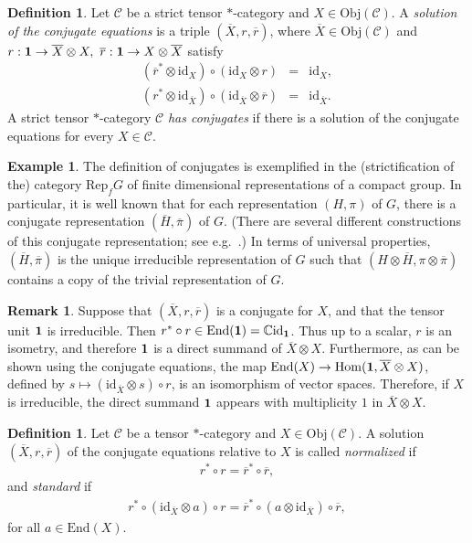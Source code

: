 \documentclass[12pt]{article}
\theoremstyle{definition}
\theoremstyle{definition}
\newtheorem{defn}[thm]{Definition}
\newtheorem{example}[thm]{Example}
\newtheorem{note}[thm]{Remark}
\theoremstyle{remark}
\newcommand{\Obj}{\mathrm{Obj}}
\def\2#1{{\mathcal #1}}
\def\7#1{{\mathbb #1}}
\def\1#1{{\bf #1}}
\def\ol#1{{\overline #1}}
\newcommand{\Hom}{\mathrm{Hom}}
\newcommand{\End}{\mathrm{End}}
\newcommand{\Rep}{\mathrm{Rep}}
\newcommand{\rarr}{\rightarrow}
\def\id{\mathrm{id}}
\begin{document}
\begin{defn} Let $\2C$ be a strict tensor $*$-category
  and $X\in\Obj (\2C )$. A \emph{solution of the
    conjugate equations} is a triple
  $(\overline{X},r,\overline{r})$, where
  $\overline{X}\in\Obj (\2C )$ and $r:\11\rarr
  \overline{X}\otimes X,\ \overline{r}:\11\rarr
  X\otimes\overline{X}$ satisfy
\begin{eqnarray*}
  (\overline{r}^*\otimes\id_X )\circ (\id_X\otimes r) &=&\id_X, \\
  (r^*\otimes\id_{\overline{X}})\circ (\id_{\overline{X}}\otimes\overline{r}) 
  &=&\id_{\overline{X}}.
\end{eqnarray*}
A strict tensor $*$-category $\2C$ \emph{has
  conjugates} if there is a solution of the conjugate
equations for every $X\in\2C$.
\end{defn}


\begin{example} The definition of conjugates is
  exemplified in the (strictification of the) category
  $\Rep _fG$ of finite dimensional representations of a
  compact group.  In particular, it is well known that
  for each representation $(H, \pi)$ of $G$, there is a
  conjugate representation $(\ol H ,\ol\pi )$ of $G$.
  (There are several different constructions of this
  conjugate representation; see e.g.\ \cite[p.\
  30]{simon}.)  In terms of universal properties, $(\ol
  H,\ol\pi )$ is the unique irreducible representation
  of $G$ such that $(H\otimes \ol H ,\pi \otimes \ol\pi
  )$ contains a copy of the trivial representation of
  $G$.
\end{example}

\begin{note} Suppose that $(\ol X,r,\ol r)$ is a
  conjugate for $X$, and that the tensor unit $\11$ is
  irreducible.  Then $r^*\circ r\in \End (\11 )=\7C \id
  _{\11}$.  Thus up to a scalar, $r$ is an isometry,
  and therefore $\11$ is a direct summand of $\ol
  X\otimes X$.  Furthermore, as can be shown using the
  conjugate equations, the map $\End (X)\to \Hom (\11
  ,\ol X\otimes X)$, defined by $s\mapsto (\id _{\ol
    X}\otimes s )\circ r$, is an isomorphism of vector
  spaces.  Therefore, if $X$ is irreducible, the direct
  summand $\11$ appears with multiplicity $1$ in $\ol
  X\otimes X$.
  \label{multiplicity}
\end{note}


\begin{defn} Let $\2C$ be a tensor $*$-category and
  $X\in \Obj (\2C )$.  A solution $(\ol X,r,\ol r)$ of
  the conjugate equations relative to $X$ is called
  \emph{normalized} if
$$ r^*\circ r = \ol r^*\circ \ol r ,$$
and \emph{standard} if
\begin{eqnarray*} 
  r^*\circ (\id _{\ol X}\otimes a)\circ r =\ol r^* \circ (a\otimes \id _{\ol X})\circ
  \ol r ,\end{eqnarray*}
for all $a\in \End (X)$.  
\end{defn}
\end{document}
